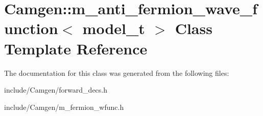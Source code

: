\hypertarget{a00331}{\section{Camgen\-:\-:m\-\_\-anti\-\_\-fermion\-\_\-wave\-\_\-function$<$ model\-\_\-t $>$ Class Template Reference}
\label{a00331}
}


The documentation for this class was generated from the following files\-:\begin{DoxyCompactItemize}
\item 
include/\-Camgen/forward\-\_\-decs.\-h\item 
include/\-Camgen/m\-\_\-fermion\-\_\-wfunc.\-h\end{DoxyCompactItemize}
